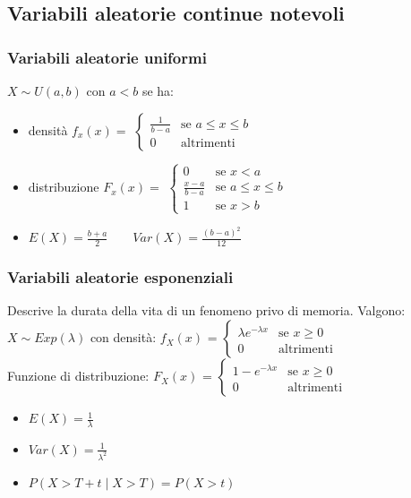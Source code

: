 \documentclass[10pt,a4paper]{article}
\begin{document}
\begin{multicols}{2}
\subsection*{Variabili aleatorie continue notevoli}
\subsubsection*{Variabili aleatorie uniformi}
$X\sim U(a,b)$ con $a<b$ se ha:
\begin{itemize}
    \item densità $f_x(x) =$
        $ \begin{cases}
            \frac{1}{b-a} &\mbox{se } a\leq x\leq b \\
            0 &\mbox{altrimenti}
        \end{cases} $
    \item distribuzione $F_x(x) =$
        $ \begin{cases}
            0 &\mbox{se } x<a\\
            \frac{x-a}{b-a} &\mbox{se } a\leq x\leq b \\
            1 &\mbox{se } x>b
        \end{cases} $
    \item $E(X)=\frac{b+a}{2} \qquad Var(X)=\frac{(b-a)^2}{12}$
\end{itemize}
    
    
    
\subsubsection*{Variabili aleatorie esponenziali}
    Descrive la durata della vita di un fenomeno privo di memoria. Valgono:
    $X \sim Exp(\lambda)$ con densit\`a:
    $f_X(x)$ = $ \begin{cases}
        \lambda e^{-\lambda x} & \text{se } x \geq 0 \\
        0 & \text{altrimenti}
    \end{cases} $\\
    Funzione di distribuzione:
    $F_X(x)$ = $ \begin{cases}
        1-e^{-\lambda x} & \text{se } x \geq 0 \\
        0 & \text{altrimenti}
    \end{cases} $
    
    \begin{itemize}
        \item $E(X) = \frac{1}{\lambda}$
        \item $Var(X) = \frac{1}{\lambda^2}$
        \item $P(X > T+t \mid X > T) = P(X > t)$
    \end{itemize}



\end{multicols}
\end{document}
